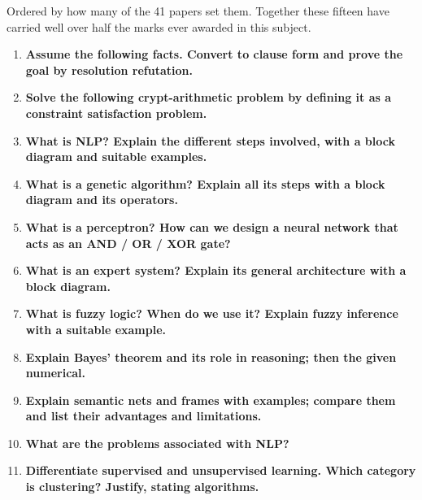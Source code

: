\hr


{\color{sub}\footnotesize Ordered by how many of the 41 papers set them. Together these
fifteen have carried well over half the marks ever awarded in this subject.}

\begin{enumerate}[topsep=2pt, itemsep=1.5pt, leftmargin=*]
  \item \textbf{Assume the following facts. Convert to clause form and prove the goal by
        resolution refutation.} \hfill {} 
  \item \textbf{Solve the following crypt-arithmetic problem by defining it as a
        constraint satisfaction problem.} \hfill {} 
  \item \textbf{What is NLP? Explain the different steps involved, with a block diagram
        and suitable examples.} \hfill {} 
  \item \textbf{What is a genetic algorithm? Explain all its steps with a block diagram
        and its operators.} \hfill {} 
  \item \textbf{What is a perceptron? How can we design a neural network that acts as an
        AND / OR / XOR gate?} \hfill {} 
  \item \textbf{What is an expert system? Explain its general architecture with a block
        diagram.} \hfill {} 
  \item \textbf{What is fuzzy logic? When do we use it? Explain fuzzy inference with a
        suitable example.} \hfill {} 
  \item \textbf{Explain Bayes' theorem and its role in reasoning; then the given
        numerical.} \hfill {} 
  \item \textbf{Explain semantic nets and frames with examples; compare them and list
        their advantages and limitations.} \hfill {} 
  \item \textbf{What are the problems associated with NLP?} \hfill {}
  \item \textbf{Differentiate supervised and unsupervised learning. Which category is
        clustering? Justify, stating algorithms.} \hfill {} 

\end{enumerate}
